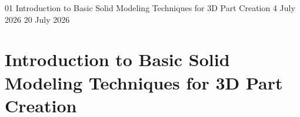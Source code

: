 \begin{refsection}

  \GenerateCoverPage
  {01} %
  {Introduction to Basic Solid Modeling Techniques for 3D Part Creation} %
  {4 July 2026} %
  {20 July 2026} %

  \noindent

  \chapter{Introduction to Basic Solid Modeling Techniques for 3D Part Creation}

  
  
  
  
  
  
  
  
  
  
  
  
  
  
  
  
  

\end{refsection}

\setcounter{section}{0}
